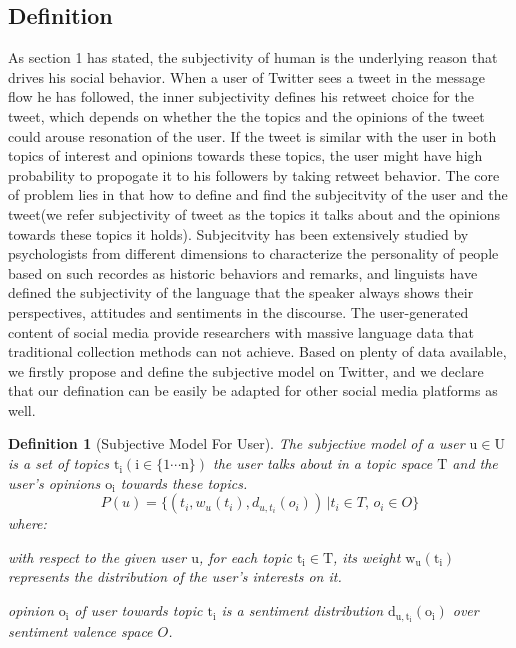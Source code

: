 \documentclass{acm_proc_article-sp}
\newtheorem{definition}{Definition}
\begin{document}
\subsection{Definition}
As section 1 has stated, the subjectivity of human is the underlying reason that drives his social behavior.
When a user of Twitter sees a tweet in the message flow he has followed, the inner subjectivity defines his retweet choice for the tweet, which depends on whether the the topics and the opinions of the tweet could arouse resonation of the user.
If the tweet  is similar with the user in both topics of interest and opinions towards these topics, the user might have high probability to propogate it to his followers by taking retweet behavior. 
The core of problem lies in that how to define and find the subjecitvity of the user and the tweet(we refer subjectivity of tweet as the topics it talks about and the opinions towards these topics it holds). 
Subjecitvity has been extensively studied by psychologists from different dimensions to characterize the personality of people based on such recordes as historic behaviors and remarks\cite{Engbert2007}, and linguists have defined the subjectivity of the language that the speaker always shows their perspectives, attitudes and sentiments in the discourse\cite{stein2005subjectivity}. 
The user-generated content of social media provide researchers with massive language data that traditional collection methods can not achieve.
Based on plenty of data available, we firstly propose and define the subjective model on Twitter, and we declare that our defination can be easily be adapted for other social media platforms as well.
\begin{definition}[Subjective Model For User]
The subjective model of a user $\mathrm{u \in U}$ is a set of topics $\mathrm{t_{i} \left( i \in \lbrace1 \cdots n \rbrace \right) }$ 
the user talks about in a topic space $\mathrm{T}$ and the user's opinions $\mathrm{o_{i}}$ towards these topics.
\begin{equation}
P \left( u \right) = \lbrace \left( t_{i}, w_{u} \left( t_{i} \right), d_{u,t_{i}} \left( o_{i} \right) \right) \,\vert  t_{i} \in T, \, o_{i} \in O \rbrace
\end{equation}
where:
\begin{itemize*}
\item with respect to the given user $\mathrm{u}$,  for each topic $\mathrm{t_{i} \in T}$, its  weight $\mathrm{ w_{u} \left( t_{i} \right)}$ represents the distribution of the user's interests on it.
\item opinion $\mathrm{o_{i}}$ of user towards topic $\mathrm{t_{i}}$ is a sentiment distribution  $\mathrm{d_{u,t_{i}} \left( o_{i} \right)}$ over sentiment valence space $O$.
\end{itemize*}
\end{definition}
\end{document}
